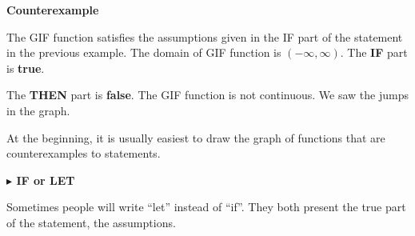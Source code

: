 \documentclass{ximera}
\begin{document}
\begin{explanation} \textbf{\textcolor{red!75!green}{Counterexample}}  


The GIF function satisfies the assumptions given in the IF part of the statement in the previous example. The domain of GIF function is $(-\infty, \infty)$.  The \textbf{\textcolor{purple!85!blue}{IF}} part is  \textbf{\textcolor{purple!85!blue}{true}}.

The \textbf{\textcolor{blue!75!black}{THEN}} part is  \textbf{\textcolor{blue!75!black}{false}}. The GIF function is not continuous.  We saw the jumps in the graph.


\end{explanation}



At the beginning, it is usually easiest to draw the graph of functions that are counterexamples to statements.




\textbf{\textcolor{blue!55!black}{$\blacktriangleright$ IF or LET}}

Sometimes people will write ``let'' instead of ``if''.  They both present the true part of the statement, the assumptions.
\end{document}
